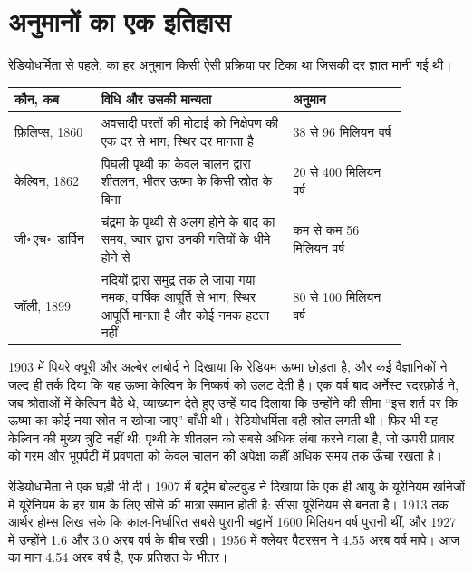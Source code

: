 \section{अनुमानों का एक इतिहास}

रेडियोधर्मिता से पहले,  का हर अनुमान किसी ऐसी प्रक्रिया पर टिका था
जिसकी दर ज्ञात मानी गई थी।

\begin{center}
\small
\begin{tabular}{|p{0.19\linewidth}|p{0.42\linewidth}|p{0.25\linewidth}|}
\hline
कौन, कब & विधि और उसकी मान्यता & अनुमान \\
\hline
फ़िलिप्स, 1860 & अवसादी परतों की मोटाई को निक्षेपण की एक दर से भाग; स्थिर दर मानता है & 38 से 96 मिलियन वर्ष \\
केल्विन, 1862 & पिघली पृथ्वी का केवल चालन द्वारा शीतलन, भीतर ऊष्मा के किसी स्रोत के बिना & 20 से 400 मिलियन वर्ष \\
जी॰\,एच॰~डार्विन & चंद्रमा के पृथ्वी से अलग होने के बाद का समय, ज्वार द्वारा उनकी गतियों के धीमे होने से & कम से कम 56 मिलियन वर्ष \\
जॉली, 1899 & नदियों द्वारा समुद्र तक ले जाया गया नमक, वार्षिक आपूर्ति से भाग; स्थिर आपूर्ति मानता है और कोई नमक हटता नहीं & 80 से 100 मिलियन वर्ष \\
\hline
\end{tabular}
\end{center}

\begin{history}[केल्विन की लुप्त ऊष्मा]
1903 में पियरे क्यूरी और अल्बेर लाबोर्द ने दिखाया कि रेडियम ऊष्मा छोड़ता है,
और कई वैज्ञानिकों ने जल्द ही तर्क दिया कि यह ऊष्मा केल्विन के निष्कर्ष को
उलट देती है। एक वर्ष बाद अर्नेस्ट रदरफ़ोर्ड ने, जब श्रोताओं में केल्विन बैठे थे,
व्याख्यान देते हुए उन्हें याद दिलाया कि उन्होंने  की सीमा
``इस शर्त पर कि ऊष्मा का कोई नया स्रोत न खोजा जाए'' बाँधी थी। रेडियोधर्मिता
वही स्रोत लगती थी। फिर भी यह केल्विन की मुख्य त्रुटि नहीं थी: पृथ्वी के शीतलन को सबसे अधिक
लंबा करने वाला  है, जो ऊपरी प्रावार को गरम और भूपर्पटी में
प्रवणता को केवल चालन की अपेक्षा कहीं अधिक समय तक ऊँचा रखता है।
\end{history}

रेडियोधर्मिता ने एक घड़ी भी दी। 1907 में बर्ट्रम बोल्टवुड ने दिखाया कि
एक ही आयु के यूरेनियम खनिजों में यूरेनियम के हर ग्राम के लिए सीसे की मात्रा
समान होती है: सीसा यूरेनियम से बनता है। 1913 तक आर्थर होम्स
लिख सके कि काल-निर्धारित सबसे पुरानी चट्टानें \num{1600} मिलियन वर्ष पुरानी थीं, और
1927 में उन्होंने  1.6 और 3.0 अरब वर्ष के बीच रखी। 1956 में क्लेयर
पैटरसन ने 4.55 अरब वर्ष मापे। आज का मान 4.54 अरब वर्ष है,
एक प्रतिशत के भीतर।

